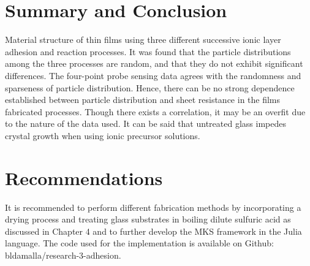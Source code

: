 \chapter{Summary and Conclusion}

Material structure of thin films using three different successive ionic layer adhesion and reaction processes.
It was found that the particle distributions among the three processes are random, and that they do not exhibit significant differences.
The four-point probe sensing data agrees with the randomness and sparseness of particle distribution.
Hence, there can be no strong dependence established between particle distribution and sheet resistance in the films fabricated processes.
Though there exists a correlation, it may be an overfit due to the nature of the data used.
It can be said that untreated glass impedes crystal growth when using ionic precursor solutions.

\chapter{Recommendations}

It is recommended to perform different fabrication methods by incorporating a drying process and treating glass substrates in boiling dilute sulfuric acid as discussed in Chapter 4 and to further develop the MKS framework in the Julia language.
The code used for the implementation is available on Github: bldamalla/research-3-adhesion.
